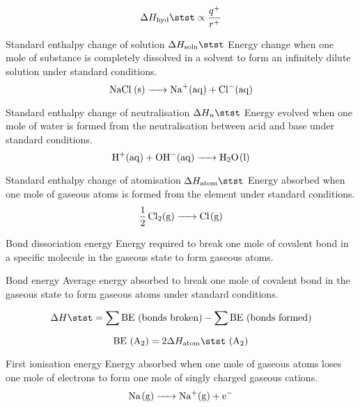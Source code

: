 \begin{equation}
\Delta H_\text{hyd}\stst\propto\frac{q^+}{r^+}
\end{equation}

\begin{defn}{Standard enthalpy change of solution $\Delta H_{\mathrm{soln}}\stst$}{}
Energy change when one mole of substance is completely dissolved in a solvent to form an infinitely dilute solution under standard conditions.
\[ \ce{NaCl (s) -> Na^+(aq) + Cl^-(aq)} \]
\end{defn}

\begin{defn}{Standard enthalpy change of neutralisation $\Delta H_n\stst$}{}
Energy evolved when one mole of water is formed from the neutralisation between acid and base under standard conditions.
\[ \ce{H^+(aq) + OH^-(aq) -> H2O(l)} \]
\end{defn}

\begin{defn}{Standard enthalpy change of atomisation $\Delta H_{\mathrm{atom}}\stst$}{}
Energy absorbed when one mole of gaseous atoms is formed from the element under standard conditions.
\[ \ce{1/2 Cl2(g) -> Cl(g)} \]
\end{defn}

\begin{defn}{Bond dissociation energy}{}
Energy required to break one mole of covalent bond in a specific molecule in the gaseous state to form gaseous atoms.
\end{defn}

\begin{defn}{Bond energy}{}
Average energy absorbed to break one mole of covalent bond in the gaseous state to form gaseous atoms under standard conditions.
\end{defn}

\begin{equation}
\Delta H\stst=\sum\text{BE (bonds broken)}-\sum\text{BE (bonds formed)}
\end{equation}

\begin{equation}
\text{BE (\ce{A2})}=2\Delta H_\text{atom}\stst\text{ (\ce{A2})}
\end{equation}

\begin{defn}{First ionisation energy}{}
Energy absorbed when one mole of gaseous atoms loses one mole of electrons to form one mole of singly charged gaseous cations.
\[ \ce{Na(g) -> Na^+(g) + e^-} \]
\end{defn}

